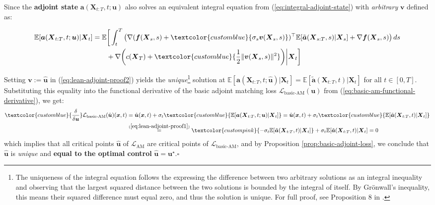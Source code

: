 \documentclass{article}
\newcommand{\bluetext}[1]{\textcolor{customblue}{#1}}
\newcommand{\pinktext}[1]{\textcolor{custompink}{#1}}
\begin{document}
Since the \textbf{adjoint state} $\boldsymbol{a}(\boldsymbol{X}_{t:T},t;\boldsymbol{u})$ also solves an equivalent integral equation from (\ref{eq:integral-adjoint-state}) with \textit{arbitrary} $\boldsymbol{v}$ defined as:
\begin{small}
\begin{align}
    \mathbb{E}[\boldsymbol{a}(\boldsymbol{X}_{t:T},t;\boldsymbol{u})|\boldsymbol{X}_t]&=\mathbb{E}\bigg[\int_t^T\left(\nabla (\boldsymbol{f}(\boldsymbol{X}_s,s)+\bluetext{\sigma_s\boldsymbol{v}(\boldsymbol{X}_s,s)})^\top\mathbb{E}[\tilde{\boldsymbol{a}}(\boldsymbol{X}_{s:T},s)|\boldsymbol{X}_s]+\nabla \boldsymbol{f}(\boldsymbol{X}_s,s)\right)ds\nonumber\\
    &\quad \quad +\nabla \bigg(c(\boldsymbol{X}_T)+\bluetext{\frac{1}{2}\|\boldsymbol{v}(\boldsymbol{X}_s,s)\|^2}\bigg)\bigg|\boldsymbol{X}_t\bigg]\label{eq:lean-adjoint-proof2}
\end{align}
\end{small}
Setting $\boldsymbol{v}:=\hat{\boldsymbol{u}}$ in (\ref{eq:lean-adjoint-proof2}) yields the \textit{unique}\footnote{The uniqueness of the integral equation follows the expressing the difference between two arbitrary solutions as an integral inequality and observing that the largest squared distance between the two solutions is bounded by the integral of itself. By Grönwall’s inequality, this means their squared difference must equal zero, and thus the solution is unique. For full proof, see Proposition 8 in \citep{domingo2024adjoint}.} solution at $\mathbb{E}[\boldsymbol{a}(\boldsymbol{X}_{t:T},t;\hat{\boldsymbol{u}})|\boldsymbol{X}_t]=\mathbb{E}[\tilde{\boldsymbol{a}}(\boldsymbol{X}_{t:T},t)|\boldsymbol{X}_t]$ for all $t\in [0,T]$. Substituting this equality into the functional derivative of the basic adjoint matching loss $\mathcal{L}_{\text{basic-AM}}(\boldsymbol{u})$ from (\ref{eq:basic-am-functional-derivative}), we get: 
\begin{align}
    \bluetext{\frac{\delta}{\delta \boldsymbol{u}}}\mathcal{L}_{\text{basic-AM}}(\hat{\boldsymbol{u}})(\boldsymbol{x},t)&=\hat{\boldsymbol{u}}(\boldsymbol{x},t)+\sigma_t\bluetext{\mathbb{E}[\boldsymbol{a}(\boldsymbol{X}_{t:T},t; \boldsymbol{u})|\boldsymbol{X}_t]}=\hat{\boldsymbol{u}}(\boldsymbol{x},t)+\sigma_t\bluetext{\mathbb{E}[\tilde{\boldsymbol{a}}(\boldsymbol{X}_{t:T},t)|\boldsymbol{X}_t]}\nonumber\\
    &\overset{(\ref{eq:lean-adjoint-proof1})}{=}\pinktext{-\sigma_t\mathbb{E}[\tilde{\boldsymbol{a}}(\boldsymbol{X}_{t:T},t)|\boldsymbol{X}_t]}+\sigma_t\mathbb{E}[\tilde{\boldsymbol{a}}(\boldsymbol{X}_{t:T},t)|\boldsymbol{X}_t]=0
\end{align}
which implies that all critical points $\hat{\boldsymbol{u}}$ of $\mathcal{L}_{\text{AM}}$ are critical points of $\mathcal{L}_{\text{basic-AM}}$, and by Proposition \ref{prop:basic-adjoint-loss}, we conclude that $\hat{\boldsymbol{u}}$ is \textit{unique} and \textbf{equal to the optimal control} $\hat{\boldsymbol{u}}=\boldsymbol{u}^\star$.\hfill $\square$
\end{document}
